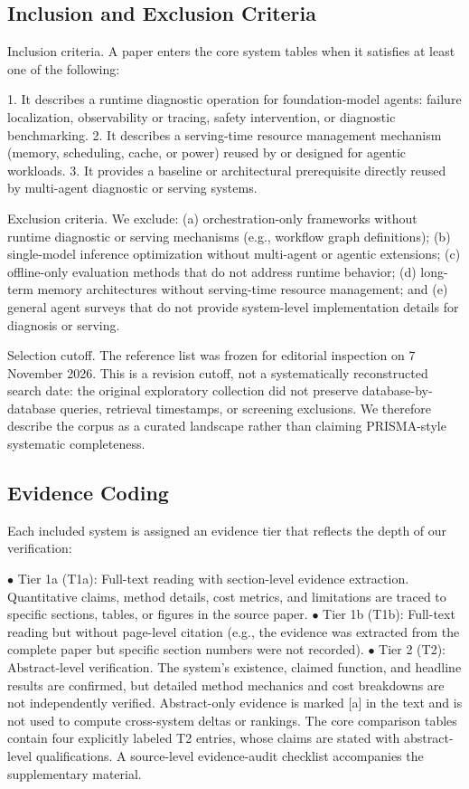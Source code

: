 \documentclass[preprint,12pt]{elsarticle}
\begin{document}
\subsection{Inclusion and Exclusion Criteria}
Inclusion criteria. A paper enters the core system tables when it satisfies at least one of the following:


1. It describes a runtime diagnostic operation for foundation-model agents: failure localization, observability or tracing, safety intervention, or diagnostic benchmarking. 2. It describes a serving-time resource management mechanism (memory, scheduling, cache, or power) reused by or designed for agentic workloads. 3. It provides a baseline or architectural prerequisite directly reused by multi-agent diagnostic or serving systems.


Exclusion criteria. We exclude: (a) orchestration-only frameworks without runtime diagnostic or serving mechanisms (e.g., workflow graph definitions); (b) single-model inference optimization without multi-agent or agentic extensions; (c) offline-only evaluation methods that do not address runtime behavior; (d) long-term memory architectures without serving-time resource management; and (e) general agent surveys that do not provide system-level implementation details for diagnosis or serving.


Selection cutoff. The reference list was frozen for editorial inspection on 7 November 2026. This is a revision cutoff, not a systematically reconstructed search date: the original exploratory collection did not preserve database-by-database queries, retrieval timestamps, or screening exclusions. We therefore describe the corpus as a curated landscape rather than claiming PRISMA-style systematic completeness.


\subsection{Evidence Coding}
Each included system is assigned an evidence tier that reflects the depth of our verification:


$\bullet$ Tier 1a (T1a): Full-text reading with section-level evidence extraction. Quantitative claims, method details, cost metrics, and limitations are traced to specific sections, tables, or figures in the source paper. $\bullet$ Tier 1b (T1b): Full-text reading but without page-level citation (e.g., the evidence was extracted from the complete paper but specific section numbers were not recorded). $\bullet$ Tier 2 (T2): Abstract-level verification. The system's existence, claimed function, and headline results are confirmed, but detailed method mechanics and cost breakdowns are not independently verified. Abstract-only evidence is marked [a] in the text and is not used to compute cross-system deltas or rankings. The core comparison tables contain four explicitly labeled T2 entries, whose claims are stated with abstract-level qualifications. A source-level evidence-audit checklist accompanies the supplementary material.
\end{document}

